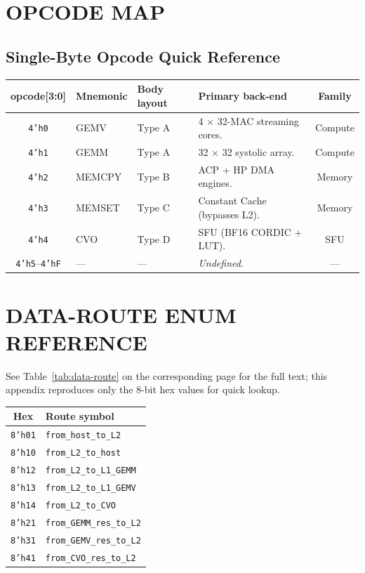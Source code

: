 \documentclass[11pt,a4paper,twoside,openany]{report}
\begin{document}
\chapter{OPCODE MAP}

\section{Single-Byte Opcode Quick Reference}

\begin{longtable}{|c|l|l|p{5.5cm}|c|}
\hline
\rowcolor{skytint}
\textbf{opcode[3:0]} & \textbf{Mnemonic} & \textbf{Body layout} & \textbf{Primary back-end} & \textbf{Family} \\
\hline
\endfirsthead
\texttt{4'h0} & GEMV   & Type A & 4 $\times$ 32-MAC streaming cores.   & Compute \\
\hline
\texttt{4'h1} & GEMM   & Type A & 32 $\times$ 32 systolic array.       & Compute \\
\hline
\texttt{4'h2} & MEMCPY & Type B & ACP + HP DMA engines.                & Memory \\
\hline
\texttt{4'h3} & MEMSET & Type C & Constant Cache (bypasses L2).        & Memory \\
\hline
\texttt{4'h4} & CVO    & Type D & SFU (BF16 CORDIC + LUT).             & SFU \\
\hline
\texttt{4'h5}--\texttt{4'hF} & --- & --- & \textit{Undefined}. & --- \\
\hline
\end{longtable}

\chapter{DATA-ROUTE ENUM REFERENCE}

See Table~\ref{tab:data-route} on the corresponding page for the
full text; this appendix reproduces only the 8-bit hex values for
quick lookup.

\begin{longtable}{|c|l|}
\hline
\rowcolor{skytint}
\textbf{Hex} & \textbf{Route symbol} \\
\hline
\endfirsthead
\texttt{8'h01} & \texttt{from\_host\_to\_L2} \\
\hline
\texttt{8'h10} & \texttt{from\_L2\_to\_host} \\
\hline
\texttt{8'h12} & \texttt{from\_L2\_to\_L1\_GEMM} \\
\hline
\texttt{8'h13} & \texttt{from\_L2\_to\_L1\_GEMV} \\
\hline
\texttt{8'h14} & \texttt{from\_L2\_to\_CVO} \\
\hline
\texttt{8'h21} & \texttt{from\_GEMM\_res\_to\_L2} \\
\hline
\texttt{8'h31} & \texttt{from\_GEMV\_res\_to\_L2} \\
\hline
\texttt{8'h41} & \texttt{from\_CVO\_res\_to\_L2} \\
\hline
\end{longtable}
\end{document}
